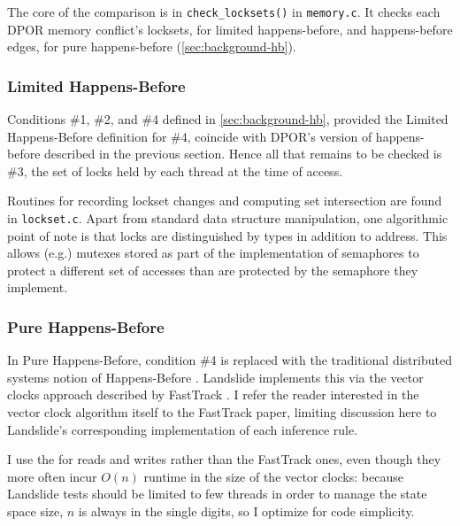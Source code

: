 The core of the comparison is in {\tt check\_locksets()} in {\tt memory.c}.
It checks each DPOR memory conflict's locksets, for limited happens-before,
and happens-before edges, for pure happens-before
(\cref{sec:background-hb}).

\subsubsection{Limited Happens-Before}
\label{sec:landslide-lhb}

Conditions \#1, \#2, and \#4 defined in \cref{sec:background-hb},
provided the Limited Happens-Before definition for \#4,
coincide with DPOR's version of happens-before described in the previous section.
Hence all that remains to be checked is \#3, the set of locks held by each thread at the time of access.

Routines for recording lockset changes and computing set intersection are found in {\tt lockset.c}.
Apart from standard data structure manipulation,
one algorithmic point of note is that locks are distinguished by types in addition to address.
This allows (e.g.) mutexes stored as part of the implementation of semaphores to protect a different set of accesses than are protected by the semaphore they implement.

\subsubsection{Pure Happens-Before}
\label{sec:landslide-phb}

In Pure Happens-Before,
condition \#4 is replaced with the traditional distributed systems notion of Happens-Before \cite{lamport-clocks}.
Landslide implements this via the vector clocks approach described by {\sc FastTrack} \cite{fasttrack}.
I refer the reader interested in the vector clock algorithm itself to the {\sc FastTrack} paper,
limiting discussion here to Landslide's corresponding implementation of each inference rule.

I use the 
for reads and writes rather than the {\sc FastTrack} ones,
even though they more often incur $O(n)$ runtime in the size of the vector clocks:
because Landslide tests should be limited to few threads in order to manage the state space size,
$n$ is always in the single digits, so I optimize for code simplicity.


